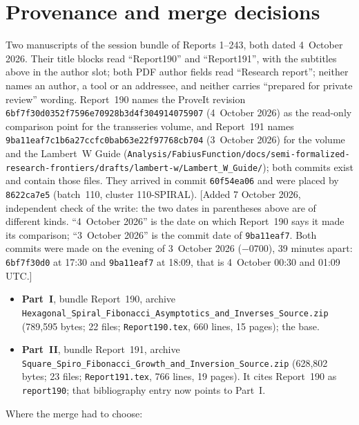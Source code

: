 \documentclass[11pt]{article}
\theoremstyle{remark}\newtheorem{remark}[theorem]{Remark}
\newcommand{\file}[1]{\nolinkurl{#1}}
\begin{document}
\section*{Provenance and merge decisions}\label{sfb:sec:provenance}
Two manuscripts of the session bundle of Reports 1--243, both dated
4~October 2026. Their title blocks read ``Report190'' and ``Report191'', with
the subtitles above in the author slot; both PDF author fields read
``Research report''; neither names an author, a tool or an addressee, and
neither carries ``prepared for private review'' wording. Report~190 names the
ProveIt revision \texttt{6bf7f30d0352f7596e70928b3d4f304914075907}
(4~October 2026) as the read-only comparison point for the transseries volume,
and Report~191 names \texttt{9ba11eaf7c1b6a27ccfc0bab63e22f97768cb704}
(3~October 2026) for the volume and the Lambert~W Guide
(\file{Analysis/FabiusFunction/docs/semi-formalized-research-frontiers/drafts/lambert-w/Lambert_W_Guide/});
both commits exist and contain those files. They arrived in commit
\texttt{60f54ea06} and were placed by \texttt{8622ca7e5} (batch~110, cluster
110-SPIRAL). [Added 7 October 2026, independent check of the write: the two
dates in parentheses above are of different kinds. ``4~October 2026'' is the
date on which Report~190 says it made its comparison; ``3~October 2026'' is
the commit date of \texttt{9ba11eaf7}. Both commits were made on the evening
of 3~October 2026 ($-0700$), 39 minutes apart: \texttt{6bf7f30d0} at 17:30
and \texttt{9ba11eaf7} at 18:09, that is 4~October 00:30 and 01:09 UTC.]
\begin{itemize}
\item \textbf{Part~I}, bundle Report~190, archive
\file{Hexagonal_Spiral_Fibonacci_Asymptotics_and_Inverses_Source.zip}
(789,595 bytes; 22 files; \file{Report190.tex}, 660 lines, 15 pages); the
base.
\item \textbf{Part~II}, bundle Report~191, archive
\file{Square_Spiro_Fibonacci_Growth_and_Inversion_Source.zip} (628,802 bytes;
23 files; \file{Report191.tex}, 766 lines, 19 pages). It cites Report~190 as
\texttt{report190}; that bibliography entry now points to Part~I.
\end{itemize}
Where the merge had to choose:
\end{document}
